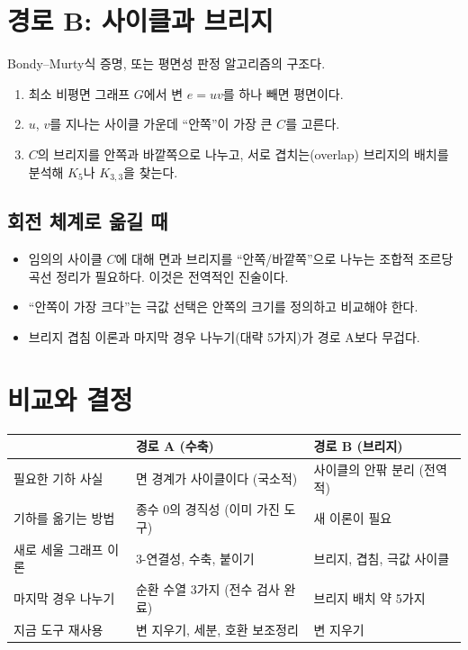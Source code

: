 \section{경로 B: 사이클과 브리지}

Bondy--Murty식 증명, 또는 평면성 판정 알고리즘의 구조다.
\begin{enumerate}
  \item 최소 비평면 그래프 \(G\)에서 변 \(e = uv\)를 하나 빼면 평면이다.
  \item \(u\), \(v\)를 지나는 사이클 가운데 ``안쪽''이 가장 큰 \(C\)를 고른다.
  \item \(C\)의 브리지를 안쪽과 바깥쪽으로 나누고, 서로 겹치는(overlap) 브리지의 배치를 분석해 \(K_5\)나
        \(K_{3,3}\)을 찾는다.
\end{enumerate}

\subsection*{회전 체계로 옮길 때}
\begin{itemize}
  \item 임의의 사이클 \(C\)에 대해 면과 브리지를 ``안쪽/바깥쪽''으로 나누는 조합적 조르당 곡선 정리가
        필요하다. 이것은 전역적인 진술이다.
  \item ``안쪽이 가장 크다''는 극값 선택은 안쪽의 크기를 정의하고 비교해야 한다.
  \item 브리지 겹침 이론과 마지막 경우 나누기(대략 5가지)가 경로 A보다 무겁다.
\end{itemize}

\section{비교와 결정}

\begin{center}
\begin{tabular}{lll}
\hline
 & 경로 A (수축) & 경로 B (브리지) \\
\hline
필요한 기하 사실 & 면 경계가 사이클이다 (국소적) & 사이클의 안팎 분리 (전역적) \\
기하를 옮기는 방법 & 종수 0의 경직성 (이미 가진 도구) & 새 이론이 필요 \\
새로 세울 그래프 이론 & 3-연결성, 수축, 붙이기 & 브리지, 겹침, 극값 사이클 \\
마지막 경우 나누기 & 순환 수열 3가지 (전수 검사 완료) & 브리지 배치 약 5가지 \\
지금 도구 재사용 & 변 지우기, 세분, 호환 보조정리 & 변 지우기 \\
\hline
\end{tabular}
\end{center}

